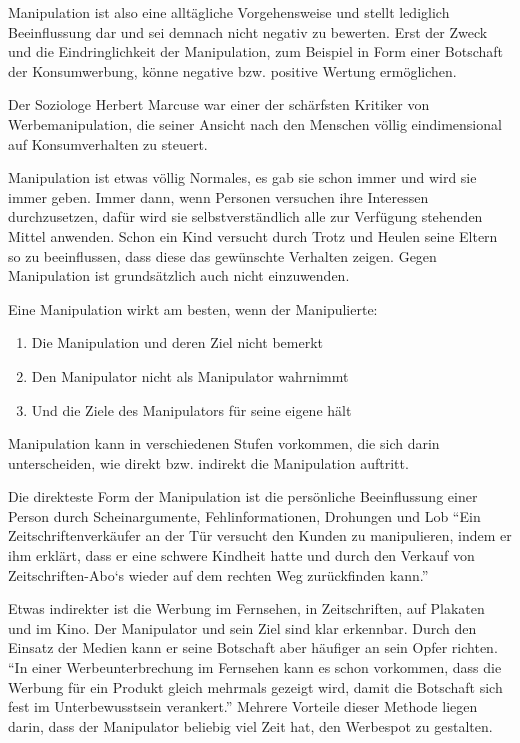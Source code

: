 Manipulation ist also eine alltägliche Vorgehensweise und stellt lediglich Beeinflussung dar und sei
demnach nicht negativ zu bewerten. Erst der Zweck und die Eindringlichkeit der Manipulation, zum
Beispiel in Form einer Botschaft der Konsumwerbung, könne negative bzw. positive Wertung ermöglichen.

Der Soziologe Herbert Marcuse war einer der schärfsten Kritiker von Werbemanipulation, die seiner
Ansicht nach den Menschen völlig eindimensional auf Konsumverhalten zu steuert.

Manipulation ist etwas völlig Normales, es gab sie schon immer und wird sie immer geben. Immer dann,
wenn Personen versuchen ihre Interessen durchzusetzen, dafür wird sie selbstverständlich alle zur
Verfügung stehenden Mittel anwenden. Schon ein Kind versucht durch Trotz und Heulen seine Eltern so
zu beeinflussen, dass diese das gewünschte Verhalten zeigen. Gegen Manipulation ist grundsätzlich
auch nicht einzuwenden.

Eine Manipulation wirkt am besten, wenn der Manipulierte:
\begin{enumerate}
	\item Die Manipulation und deren Ziel nicht bemerkt
	\item Den Manipulator nicht als Manipulator wahrnimmt
	\item Und die Ziele des Manipulators für seine eigene hält
\end{enumerate}

Manipulation kann in verschiedenen Stufen vorkommen, die sich darin unterscheiden, wie direkt bzw.
indirekt die Manipulation auftritt.

Die direkteste Form der Manipulation ist die persönliche Beeinflussung einer Person durch
Scheinargumente, Fehlinformationen, Drohungen und Lob
\zB \enquote{Ein Zeitschriftenverkäufer an der Tür versucht den Kunden zu manipulieren, indem er ihm
erklärt, dass er eine schwere Kindheit hatte und durch den Verkauf von Zeitschriften-Abo`s wieder
auf dem rechten Weg zurückfinden kann.}

Etwas indirekter ist die Werbung im Fernsehen, in Zeitschriften, auf Plakaten und im Kino. Der
Manipulator und sein Ziel sind klar erkennbar. Durch den Einsatz der Medien kann er seine Botschaft
aber häufiger an sein Opfer richten.
\zB \enquote{In einer Werbeunterbrechung im Fernsehen kann es schon vorkommen, dass die Werbung für
ein Produkt gleich mehrmals gezeigt wird, damit die Botschaft sich fest im Unterbewusstsein
verankert.}
Mehrere Vorteile dieser Methode liegen darin, dass der Manipulator beliebig viel Zeit hat, den
Werbespot zu gestalten.

